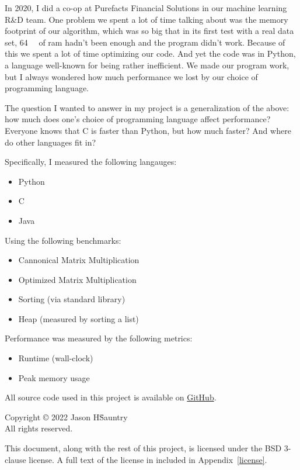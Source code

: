 \documentclass[12pt,letterpaper]{article}
\begin{document}
In 2020, I did a co-op at Purefacts Financial Solutions in our machine learning
R\&D team. One problem we spent a lot of time talking about was the memory
footprint of our algorithm, which was so big that in its first test with a real
data set, \SI{64}{\giga\byte} of ram hadn't been enough and the program didn't
work. Because of this we spent a lot of time optimizing our code. And yet the
code was in Python, a language well-known for being rather inefficient.  We
made our program work, but I always wondered how much performance we lost by
our choice of programming language.

The question I wanted to answer in my project is a generalization of the above:
how much does one's choice of programming language affect performance? Everyone
knows that C is faster than Python, but how much faster? And where do other
languages fit in?

Specifically, I measured the following langauges:

\begin{itemize}
  \item Python
  \item C
  \item Java
\end{itemize}

Using the following benchmarks:

\begin{itemize}
  \item Cannonical Matrix Multiplication
  \item Optimized Matrix Multiplication
  \item Sorting (via standard library)
  \item Heap (measured by sorting a list)
\end{itemize}

Performance was measured by the following metrics:

\begin{itemize}
  \item Runtime (wall-clock)
  \item Peak memory usage
\end{itemize}

All source code used in this project is available on
\href{https://github.com/JasonSauntry/performance-of-programming-languages}{GitHub}.

Copyright © 2022 Jason H\. Sauntry \\
All rights reserved.

This document, along with the rest of this project, is licensed under the BSD
3-clause license. A full text of the license in included in
Appendix~\ref{license}.
\end{document}
